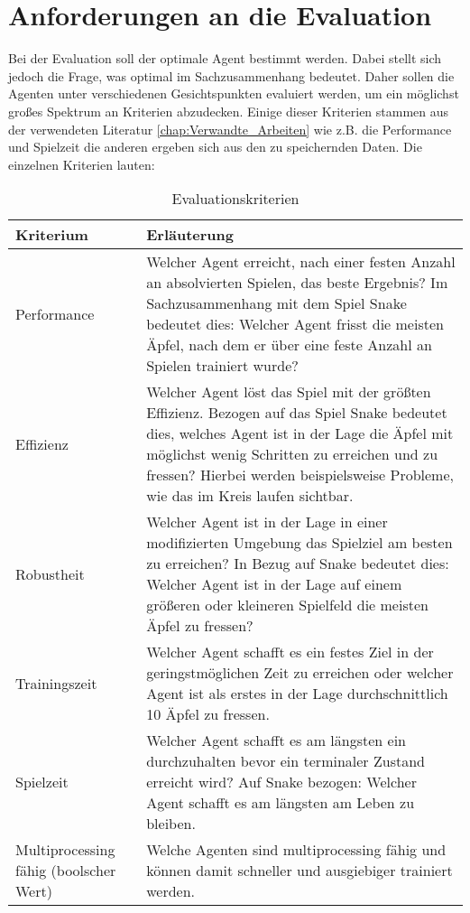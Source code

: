 \section{Anforderungen an die Evaluation} \label{sec:Anforderungen_an_die_Evaluation}
Bei der Evaluation soll der optimale Agent bestimmt werden. Dabei stellt sich jedoch die Frage, was optimal im Sachzusammenhang bedeutet. 
Daher sollen die Agenten unter verschiedenen Gesichtspunkten evaluiert werden, um ein möglichst großes Spektrum an Kriterien abzudecken.
Einige dieser Kriterien stammen aus der verwendeten Literatur \ref{chap:Verwandte_Arbeiten} wie z.B. die Performance und Spielzeit die anderen ergeben sich aus den zu speichernden Daten.
Die einzelnen Kriterien lauten:
\begin{longtable}[h]{|p{4cm}|p{\linewidth - 5cm}|}
	\caption{Evaluationskriterien}
	\label{tab:Kriterien} 
	\endfirsthead
	\endhead
	\hline
	Kriterium & Erläuterung \\
	\hline
	Performance & Welcher Agent erreicht, nach einer festen Anzahl an absolvierten Spielen, das beste Ergebnis? Im Sachzusammenhang mit dem Spiel Snake bedeutet dies: Welcher Agent frisst die meisten Äpfel, nach dem er über eine feste Anzahl an Spielen trainiert wurde? \\
	\hline
	Effizienz & Welcher Agent löst das Spiel mit der größten Effizienz. Bezogen auf das Spiel Snake bedeutet dies, welches Agent ist in der Lage die Äpfel mit möglichst wenig Schritten zu erreichen und zu fressen? Hierbei werden beispielsweise Probleme, wie das im Kreis laufen sichtbar. \\
	\hline
	Robustheit & Welcher Agent ist in der Lage in einer modifizierten Umgebung das Spielziel am besten zu erreichen? In Bezug auf Snake bedeutet dies: Welcher Agent ist in der Lage auf einem größeren oder kleineren Spielfeld die meisten Äpfel zu fressen? \\
	\hline
	Trainingszeit & Welcher Agent schafft es ein festes Ziel in der geringstmöglichen Zeit zu erreichen oder welcher Agent ist als erstes in der Lage durchschnittlich 10 Äpfel zu fressen. \\
	\hline
	Spielzeit & Welcher Agent schafft es am längsten ein durchzuhalten bevor ein terminaler Zustand erreicht wird? Auf Snake bezogen: Welcher Agent schafft es am längsten am Leben zu bleiben. \\
	\hline
	Multiprocessing fähig (boolscher Wert) & Welche Agenten sind multiprocessing fähig und können damit schneller und ausgiebiger trainiert werden. \\
	\hline
\end{longtable}